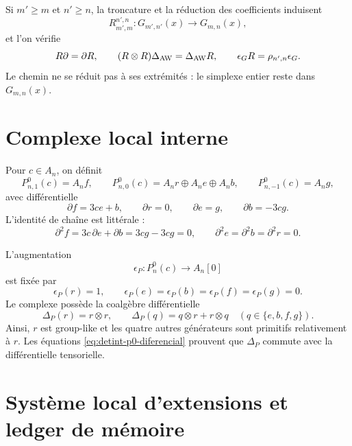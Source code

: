 Si \(m'\ge m\) et \(n'\ge n\), la troncature et la réduction des coefficients
induisent
\begin{equation}\label{eq:detint-rmn}
 R_{m',m}^{n',n}:G_{m',n'}(x)\longrightarrow G_{m,n}(x),
\end{equation}
et l'on vérifie
\begin{equation}\label{eq:detint-aw-natural}
 R\partial=\partial R,
 \qquad
 (R\otimes R)\Delta_{\rm AW}=\Delta_{\rm AW}R,
 \qquad
 \epsilon_GR=\rho_{n',n}\epsilon_G.
\end{equation}
Le chemin ne se réduit pas à ses extrémités : le simplexe entier reste dans
\(G_{m,n}(x)\).

\section{Complexe local interne}

Pour \(c\in A_n\), on définit
\begin{equation}\label{eq:detint-p0-grados}
 P^0_{n,1}(c)=A_nf,
 \qquad
 P^0_{n,0}(c)=A_nr\oplus A_ne\oplus A_nb,
 \qquad
 P^0_{n,-1}(c)=A_ng,
\end{equation}
avec différentielle
\begin{equation}\label{eq:detint-p0-diferencial}
 \partial f=3ce+b,
 \qquad
 \partial r=0,
 \qquad
 \partial e=g,
 \qquad
 \partial b=-3cg.
\end{equation}
L'identité de chaîne est littérale :
\begin{equation}\label{eq:detint-d2}
 \partial^2f=3c\,\partial e+\partial b=3cg-3cg=0,
 \qquad
 \partial^2e=\partial^2b=\partial^2r=0.
\end{equation}

L'augmentation
\begin{equation}\label{eq:detint-epsilon-p}
 \epsilon_P:P_n^0(c)\longrightarrow A_n[0]
\end{equation}
est fixée par
\[
 \epsilon_P(r)=1,
 \qquad
 \epsilon_P(e)=\epsilon_P(b)=\epsilon_P(f)=\epsilon_P(g)=0.
\]
Le complexe possède la coalgèbre différentielle
\begin{equation}\label{eq:detint-coalgebra-p}
 \Delta_P(r)=r\otimes r,
 \qquad
 \Delta_P(q)=q\otimes r+r\otimes q
 \quad(q\in\{e,b,f,g\}).
\end{equation}
Ainsi, \(r\) est group-like et les quatre autres générateurs sont primitifs
relativement à \(r\). Les équations
\eqref{eq:detint-p0-diferencial} prouvent que \(\Delta_P\) commute avec la
différentielle tensorielle.

\section{Système local d'extensions et ledger de mémoire}

